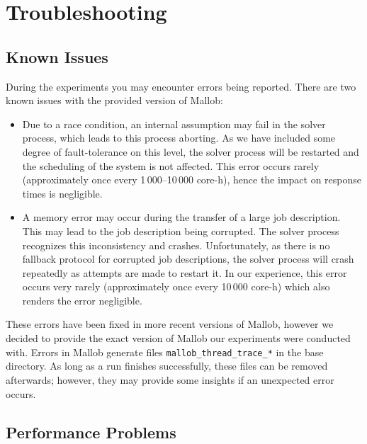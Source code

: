 \documentclass[runningheads]{article}
\numberwithin{dummy}{subsection}
\begin{document}
\section{Troubleshooting}

\subsection{Known Issues}

During the experiments you may encounter errors being reported.
There are two known issues with the provided version of Mallob:
\begin{itemize}
 \item Due to a race condition, an internal assumption may fail in the solver process, which leads to this process aborting. As we have included some degree of fault-tolerance on this level, the solver process will be restarted and the scheduling of the system is not affected. This error occurs rarely (approximately once every 1\,000--10\,000 core-h), hence the impact on response times is negligible.
 \item A memory error may occur during the transfer of a large job description. This may lead to the job description being corrupted. The solver process recognizes this inconsistency and crashes. Unfortunately, as there is no fallback protocol for corrupted job descriptions, the solver process will crash repeatedly as attempts are made to restart it.
 In our experience, this error occurs very rarely (approximately once every 10\,000 core-h) which also renders the error negligible.
\end{itemize}
These errors have been fixed in more recent versions of Mallob, however we decided to provide the exact version of Mallob our experiments were conducted with.
Errors in Mallob generate files \texttt{mallob\_thread\_trace\_*} in the base directory.
As long as a run finishes successfully, these files can be removed afterwards; however, they may provide some insights if an unexpected error occurs.

\subsection{Performance Problems}
\end{document}
